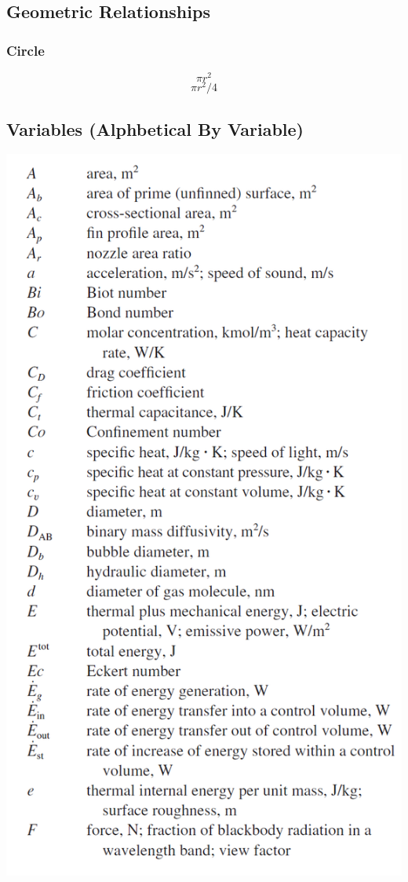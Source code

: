 \documentclass[10pt,landscape]{article}
\newenvironment{Figure}
     {\par\medskip\noindent\minipage{\linewidth}}
     {\endminipage\par\medskip}
\begin{document}
\begin{multicols}{3}
\subsection{Geometric Relationships}
\subsubsection{Circle}
\begin{equation}
    \pi r^2
\end{equation}
\begin{equation}
    \pi r^2/4
\end{equation}

\subsection{Variables (Alphbetical By Variable)}\begin{Figure}
    \centering
    \includegraphics[width=\linewidth]{Symbols_1.png}

\end{Figure}
\end{multicols}
\end{document}
